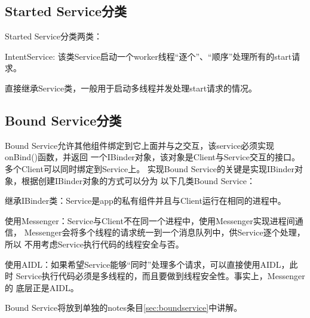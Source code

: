 ﻿\documentclass[a4paper,11pt]{article}
\begin{document}
  \subsection[Started Service分类]{Started Service分类}
  Started Service分类两类：\par
  \begin{coloredenumerate}
    \item IntentService: 该类Service启动一个worker线程“逐个”、“顺序”处理所有的start请求。
    \item 直接继承Service类，一般用于启动多线程并发处理start请求的情况。
  \end{coloredenumerate}

  \subsection[Bound Service分类]{Bound Service分类}
  Bound Service允许其他组件绑定到它上面并与之交互，该service必须实现onBind()函数，并返回
  一个IBinder对象，该对象是Client与Service交互的接口。多个Client可以同时绑定到Service上。
  实现Bound Service的关键是实现IBinder对象，根据创建IBinder对象的方式可以分为
  以下几类Bound Service：\par
  \begin{coloredenumerate}
    \item 继承IBinder类：Service是app的私有组件并且与Client运行在相同的进程中。
    \item 使用Messenger：Service与Client不在同一个进程中，使用Messenger实现进程间通信，
          Messenger会将多个线程的请求统一到一个消息队列中，供Service逐个处理，所以
          不用考虑Service执行代码的线程安全与否。
    \item 使用AIDL：如果希望Service能够“同时”处理多个请求，可以直接使用AIDL，此时
          Service执行代码必须是多线程的，而且要做到线程安全性。事实上，Messenger的
          底层正是AIDL。
  \end{coloredenumerate}
  Bound Service将放到单独的notes条目\ref{sec:boundservice}中讲解。
\end{document}
